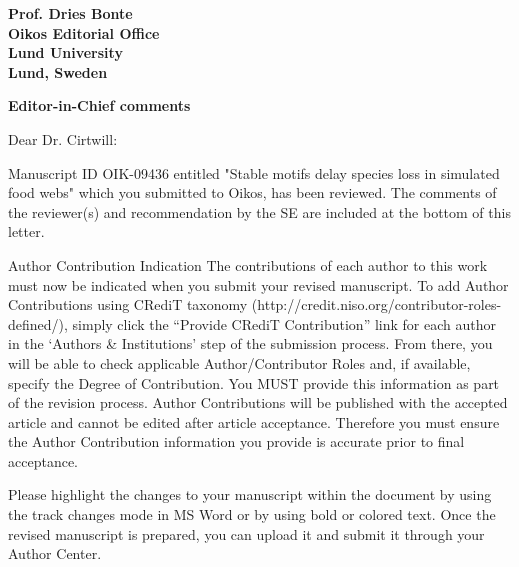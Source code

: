 \documentclass[12pt]{letter}
\begin{document}
\begin{letter}{\bf Prof. Dries Bonte\\
Oikos Editorial Office \\
Lund University \\
Lund, Sweden}










{\large \textbf{Editor-in-Chief comments}}

Dear Dr. Cirtwill:

Manuscript ID OIK-09436 entitled "Stable motifs delay species loss in simulated food webs" which you submitted to Oikos, has been reviewed.  The comments of the reviewer(s) and recommendation by the SE are included at the bottom of this letter.


Author Contribution Indication
The contributions of each author to this work must now be indicated when you submit your revised manuscript. To add Author Contributions using CRediT taxonomy (http://credit.niso.org/contributor-roles-defined/), simply click the “Provide CRediT Contribution” link for each author in the ‘Authors & Institutions’ step of the submission process. From there, you will be able to check applicable Author/Contributor Roles and, if available, specify the Degree of Contribution. You MUST provide this information as part of the revision process. Author Contributions will be published with the accepted article and cannot be edited after article acceptance. Therefore you must ensure the Author Contribution information you provide is accurate prior to final acceptance.


Please highlight the changes to your manuscript within the document by using the track changes mode in MS Word or by using bold or colored text. Once the revised manuscript is prepared, you can upload it and submit it through your Author Center.



\end{letter}
\end{document}
